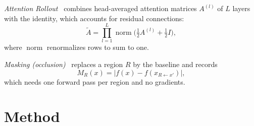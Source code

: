 \documentclass[conference]{IEEEtran}
\begin{document}
\emph{Attention Rollout}~\cite{abnar2020quantifying} combines head-averaged attention matrices $A^{(l)}$ of
$L$ layers with the identity, which accounts for residual connections:
\begin{equation}
  \tilde A = \prod_{l=1}^{L} \operatorname{norm}\!\Big(\tfrac12 A^{(l)} + \tfrac12 I\Big),
\end{equation}
where $\operatorname{norm}$ renormalizes rows to sum to one.

\emph{Masking (occlusion)}~\cite{zeiler2014visualizing} replaces a region $R$ by the baseline and records
\begin{equation}
  M_R(x) = \big|f(x) - f(x_{R\leftarrow x'})\big| ,
\end{equation}
which needs one forward pass per region and no gradients.

\section{Method}
\end{document}
